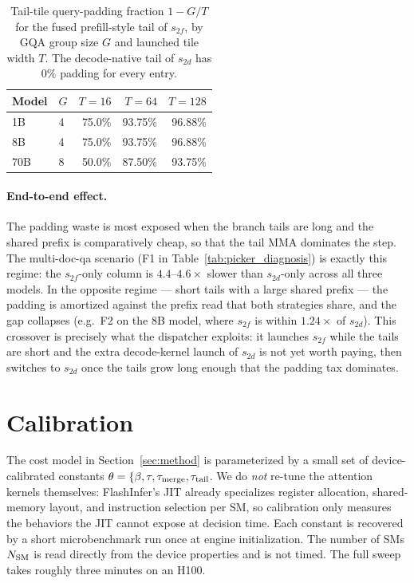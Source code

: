 \documentclass[11pt]{article}
\begin{document}
\begin{table}[H]
\centering
\caption{
Tail-tile query-padding fraction $1-G/T$ for the fused prefill-style tail
of $s_{2f}$, by GQA group size $G$ and launched tile width $T$. The
decode-native tail of $s_{2d}$ has $0\%$ padding for every entry.
}
\label{tab:padding_fraction}
\begin{tabular}{@{}llrrr@{}}
\toprule
Model & $G$ & $T=16$ & $T=64$ & $T=128$ \\
\midrule
1B  & 4 & 75.0\% & 93.75\% & 96.88\% \\
8B  & 4 & 75.0\% & 93.75\% & 96.88\% \\
70B & 8 & 50.0\% & 87.50\% & 93.75\% \\
\bottomrule
\end{tabular}
\end{table}

\paragraph{End-to-end effect.}
The padding waste is most exposed when the branch tails are long and the
shared prefix is comparatively cheap, so that the tail MMA dominates the
step. The multi-doc-qa scenario (F1 in Table~\ref{tab:picker_diagnosis})
is exactly this regime: the $s_{2f}$-only column is $4.4$--$4.6\times$
slower than $s_{2d}$-only across all three models. In the opposite regime
--- short tails with a large shared prefix --- the padding is amortized
against the prefix read that both strategies share, and the gap collapses
(e.g.\ F2 on the 8B model, where $s_{2f}$ is within $1.24\times$ of
$s_{2d}$). This crossover is precisely what the dispatcher exploits: it
launches $s_{2f}$ while the tails are short and the extra decode-kernel
launch of $s_{2d}$ is not yet worth paying, then switches to $s_{2d}$ once
the tails grow long enough that the padding tax dominates.

\section{Calibration}
  \label{appendix:calibration}

  The cost model in Section~\ref{sec:method} is parameterized by a small set
  of device-calibrated constants
  $\theta = \{\beta, \tau, \tau_{\rm merge}, \tau_{\rm tail}$.
  We do \emph{not} re-tune the attention kernels themselves: FlashInfer's
  JIT already specializes register allocation, shared-memory layout, and
  instruction selection per SM, so calibration only measures the
  behaviors the JIT cannot expose at decision time. Each constant is
  recovered by a short microbenchmark run once at engine initialization.
  The number of SMs $N_{\rm SM}$ is read directly from the device
  properties and is not timed. The full sweep takes roughly three minutes
  on an H100.
\end{document}
